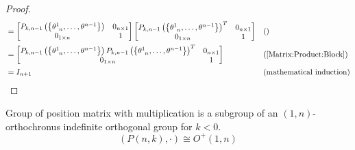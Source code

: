 \documentclass[stu, babel, american, biblatex, a4paper, leqno, draftall]{apa7}
\begin{document}
\begin{proof}
\begin{align*}
        &=
        \begin{bmatrix}
            P_{k,n-1}\left(\left\{\tensor{\theta}{^1_{n}},\dots,\tensor{\theta}{^{n-1}}\right\}\right) & 0_{n\times 1} \\
            0_{1\times n}                                                                              & 1             \\
        \end{bmatrix}
        \begin{bmatrix}
            P_{k,n-1}\left(\left\{\tensor{\theta}{^1_{n}},\dots,\tensor{\theta}{^{n-1}}\right\}\right)^T & 0_{n\times 1} \\
            0_{1\times n}                                                                              & 1             \\
        \end{bmatrix} && \text{()} \\
        &=
        \begin{bmatrix}
            P_{k,n-1}\left(\left\{\tensor{\theta}{^1_{n}},\dots,\tensor{\theta}{^{n-1}}\right\}\right)P_{k,n-1}\left(\left\{\tensor{\theta}{^1_{n}},\dots,\tensor{\theta}{^{n-1}}\right\}\right)^T & 0_{n\times 1} \\
            0_{1\times n}                                                                              & 1             \\
        \end{bmatrix} && \text{(\cref{Matrix:Product:Block})} \\
        &= I_{n+1} && \text{(mathematical induction)}
    \end{align*}
\end{proof}
\begin{proposition}
    Group of position matrix with multiplication is a subgroup of an $\left(1,n\right)$-orthochronus indefinite orthogonal group for $k<0$.
    \begin{equation*}
        \left(P\left(n, k\right),\cdot\right)\cong O^+\left(1,n\right)
    \end{equation*}
\end{proposition}
\end{document}

